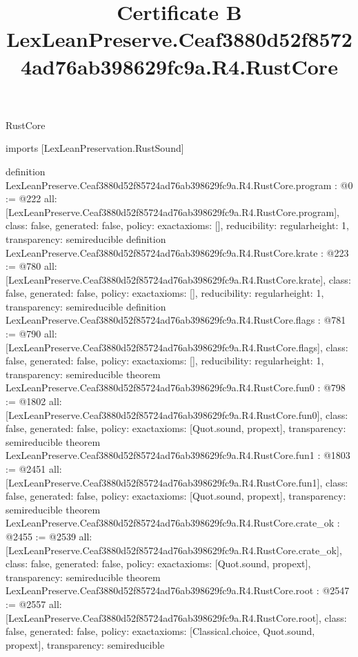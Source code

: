 \begin{lexlean}{RustCore}
\title{Certificate B LexLeanPreserve.Ceaf3880d52f85724ad76ab398629fc9a.R4.RustCore}
\begin{coremodule}
imports [LexLeanPreservation.RustSound]

definition LexLeanPreserve.Ceaf3880d52f85724ad76ab398629fc9a.R4.RustCore.program : @0 := @222 {
  all: [LexLeanPreserve.Ceaf3880d52f85724ad76ab398629fc9a.R4.RustCore.program],
  class: false,
  generated: false,
  policy: exact{axioms: []},
  reducibility: regular{height: 1},
  transparency: semireducible
}
definition LexLeanPreserve.Ceaf3880d52f85724ad76ab398629fc9a.R4.RustCore.krate : @223 := @780 {
  all: [LexLeanPreserve.Ceaf3880d52f85724ad76ab398629fc9a.R4.RustCore.krate],
  class: false,
  generated: false,
  policy: exact{axioms: []},
  reducibility: regular{height: 1},
  transparency: semireducible
}
definition LexLeanPreserve.Ceaf3880d52f85724ad76ab398629fc9a.R4.RustCore.flags : @781 := @790 {
  all: [LexLeanPreserve.Ceaf3880d52f85724ad76ab398629fc9a.R4.RustCore.flags],
  class: false,
  generated: false,
  policy: exact{axioms: []},
  reducibility: regular{height: 1},
  transparency: semireducible
}
theorem LexLeanPreserve.Ceaf3880d52f85724ad76ab398629fc9a.R4.RustCore.fun0 : @798 := @1802 {
  all: [LexLeanPreserve.Ceaf3880d52f85724ad76ab398629fc9a.R4.RustCore.fun0],
  class: false,
  generated: false,
  policy: exact{axioms: [Quot.sound, propext]},
  transparency: semireducible
}
theorem LexLeanPreserve.Ceaf3880d52f85724ad76ab398629fc9a.R4.RustCore.fun1 : @1803 := @2451 {
  all: [LexLeanPreserve.Ceaf3880d52f85724ad76ab398629fc9a.R4.RustCore.fun1],
  class: false,
  generated: false,
  policy: exact{axioms: [Quot.sound, propext]},
  transparency: semireducible
}
theorem LexLeanPreserve.Ceaf3880d52f85724ad76ab398629fc9a.R4.RustCore.crate_ok : @2455 := @2539 {
  all: [LexLeanPreserve.Ceaf3880d52f85724ad76ab398629fc9a.R4.RustCore.crate_ok],
  class: false,
  generated: false,
  policy: exact{axioms: [Quot.sound, propext]},
  transparency: semireducible
}
theorem LexLeanPreserve.Ceaf3880d52f85724ad76ab398629fc9a.R4.RustCore.root : @2547 := @2557 {
  all: [LexLeanPreserve.Ceaf3880d52f85724ad76ab398629fc9a.R4.RustCore.root],
  class: false,
  generated: false,
  policy: exact{axioms: [Classical.choice, Quot.sound, propext]},
  transparency: semireducible
}


\end{coremodule}
\end{lexlean}
